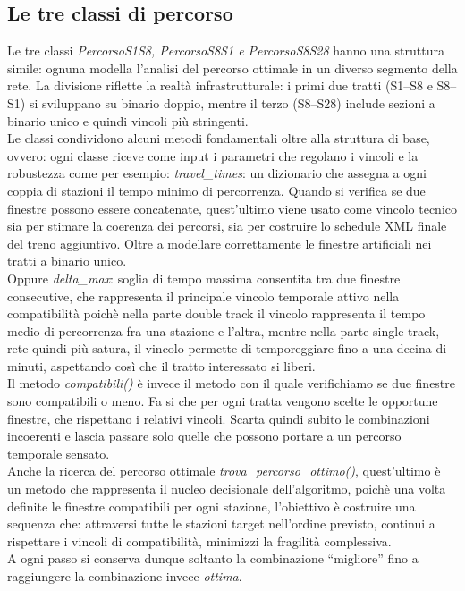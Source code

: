 \documentclass{report}
\begin{document}
\subsection{Le tre classi di percorso}
Le tre classi \textit{PercorsoS1S8, PercorsoS8S1 e PercorsoS8S28} hanno una struttura simile: ognuna modella l’analisi del percorso ottimale in un diverso segmento della rete.
La divisione riflette la realtà infrastrutturale: i primi due tratti (S1–S8 e S8–S1) si sviluppano su binario doppio, mentre il terzo (S8–S28) include sezioni a binario unico e quindi vincoli più stringenti.\\ Le classi condividono alcuni metodi fondamentali oltre alla struttura di base, ovvero: ogni classe riceve come input i parametri che regolano i vincoli e la robustezza come per esempio: \textit{travel\_times}: un dizionario che assegna a ogni coppia di stazioni il tempo minimo di percorrenza. Quando si verifica se due finestre possono essere concatenate, quest'ultimo viene usato come vincolo tecnico sia per stimare la coerenza dei percorsi, sia per costruire lo schedule XML finale del treno aggiuntivo. Oltre a modellare correttamente le finestre artificiali nei tratti a binario unico. \\ Oppure \textit{{delta\_max}}: soglia di tempo massima consentita tra due finestre consecutive, che rappresenta il principale vincolo temporale attivo nella compatibilità poichè nella parte double track il vincolo rappresenta il tempo medio di percorrenza fra una stazione e l'altra, mentre nella parte single track, rete quindi più satura, il vincolo permette di temporeggiare fino a una decina di minuti, aspettando così che il tratto interessato si liberi. \\ Il metodo \textit{compatibili()} è invece il metodo con il quale verifichiamo se due finestre sono compatibili o meno. Fa si che per ogni tratta vengono scelte le opportune finestre, che rispettano i relativi vincoli. Scarta quindi subito le combinazioni incoerenti e lascia passare solo quelle che possono portare a un percorso temporale sensato.\\ Anche la ricerca del percorso ottimale \textit{trova\_percorso\_ottimo()}, quest'ultimo è un metodo che rappresenta il nucleo decisionale dell'algoritmo, poichè una volta definite le finestre compatibili per ogni stazione, l’obiettivo è costruire una sequenza che: attraversi tutte le stazioni target nell’ordine previsto, continui a rispettare i vincoli di compatibilità, minimizzi la fragilità complessiva. \\ A ogni passo si conserva dunque soltanto la combinazione “migliore” fino a raggiungere la combinazione invece \textit{ottima}.
       
\end{document}
